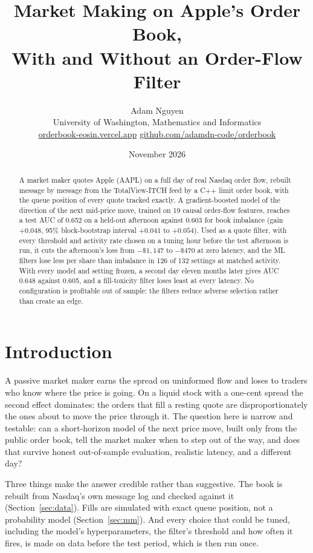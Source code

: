 \documentclass[11pt]{article}
\title{\textbf{Market Making on Apple's Order Book,\\ With and Without an Order-Flow Filter}}
\author{Adam Nguyen\\[2pt]
\small University of Washington, Mathematics and Informatics\\[1pt]
\small \href{https://orderbook-eosin.vercel.app/playground.html}{orderbook-eosin.vercel.app} \quad
\href{https://github.com/adamdn-code/orderbook}{github.com/adamdn-code/orderbook}}
\date{November 2026}
\newcommand{\dol}{\$}
\begin{document}
\maketitle

\begin{abstract}
\noindent A market maker quotes Apple (AAPL) on a full day of real Nasdaq order flow, rebuilt message by message from the TotalView-ITCH feed by a C++ limit order book, with the queue position of every quote tracked exactly. A gradient-boosted model of the direction of the next mid-price move, trained on 19 causal order-flow features, reaches a test AUC of 0.652 on a held-out afternoon against 0.603 for book imbalance (gain $+0.048$, 95\% block-bootstrap interval $+0.041$ to $+0.054$). Used as a quote filter, with every threshold and activity rate chosen on a tuning hour before the test afternoon is run, it cuts the afternoon's loss from $-\dol1{,}147$ to $-\dol470$ at zero latency, and the ML filters lose less per share than imbalance in 126 of 132 settings at matched activity. With every model and setting frozen, a second day eleven months later gives AUC 0.648 against 0.605, and a fill-toxicity filter loses least at every latency. No configuration is profitable out of sample: the filters reduce adverse selection rather than create an edge.
\end{abstract}

\section{Introduction}
A passive market maker earns the spread on uninformed flow and loses to traders who know where the price is going. On a liquid stock with a one-cent spread the second effect dominates: the orders that fill a resting quote are disproportionately the ones about to move the price through it. The question here is narrow and testable: can a short-horizon model of the next price move, built only from the public order book, tell the market maker when to step out of the way, and does that survive honest out-of-sample evaluation, realistic latency, and a different day?

Three things make the answer credible rather than suggestive. The book is rebuilt from Nasdaq's own message log and checked against it (Section~\ref{sec:data}). Fills are simulated with exact queue position, not a probability model (Section~\ref{sec:mm}). And every choice that could be tuned, including the model's hyperparameters, the filter's threshold and how often it fires, is made on data before the test period, which is then run once.
\end{document}
